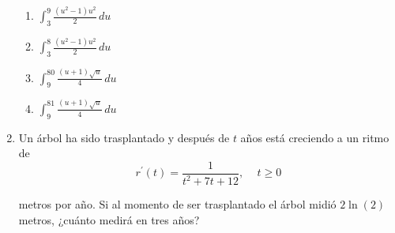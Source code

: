 \documentclass[10pt]{exam}
\begin{document}
\begin{enumerate}
\begin{multicols}{4}
\begin{enumerate}
    \item \(\displaystyle{\int_3^9 \frac{(u^2-1)u^2}{2}\, du}\)
    \item \(\displaystyle{\int_3^8 \frac{(u^2-1)u^2}{2}\, du}\)
    \item \(\displaystyle{\int_9^{80} \frac{(u+1)\sqrt{u}}{4}\, du}\)
    \item \(\displaystyle{\int_9^{81} \frac{(u+1)\sqrt{u}}{4}\, du}\)
\end{enumerate}
\end{multicols}{}


\item Un árbol ha sido trasplantado y después de \(t\) años está creciendo a un ritmo de \[r^{\prime}(t)=\frac{1}{t^2+7t+12},\,\,\,\,\,\,\, t\geq 0\]

metros por año.  Si al momento de ser trasplantado el árbol midió $2\ln(2)$ metros, ¿cuánto medirá en tres años?
\end{enumerate}
\end{document}
